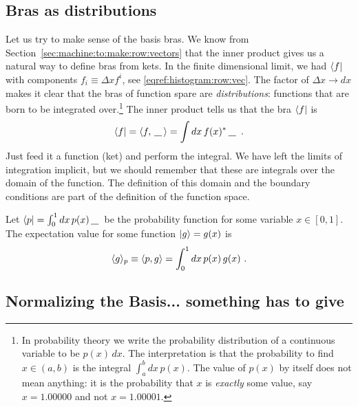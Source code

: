 \subsection{Bras as distributions}

Let us try to make sense of the basis bras. We know from Section~\ref{sec:machine:to:make:row:vectors} that the inner product gives us a natural way to define bras from kets. In the finite dimensional limit, we had  $\left\langle f\right|$ with components $f_i\equiv \Delta x f^i$, see \eqref{eqref:histogram:row:vec}. The factor of $\Delta x \to dx$ makes it clear that the bras of function spare are \emph{distributions}: functions that are born to be integrated over.\footnote{In probability theory we write the probability distribution of a continuous variable to be $p(x)\,dx$. The interpretation is that the probability to find $x\in (a,b)$ is the integral $\int_a^b dx\, p(x)$. The value of $p(x)$ by itself does not mean anything: it is the probability that $x$ is \emph{exactly} some value, say $x=1.00000$ and not $x=1.00001$.} The inner product tells us that the bra $\left\langle f\right|$ is
\begin{align}
    \bra{f} = \la f, \smallslot \ra   = \int dx\, f(x)^* \smallslot \ .
\end{align}
Just feed it a function (ket) and perform the integral. We have left the limits of integration implicit, but we should remember that these are integrals over the domain of the function. The definition of this domain and the boundary conditions are part of the definition of the function space. 
\begin{example}
Let $ \bra{p}=\int_0^1 dx\, p(x)\smallslot$ be the probability function for some variable $x \in [0,1]$. The expectation value for some function $\left|g\right\rangle=g(x)$ is
\begin{align}
\langle g\rangle_p \equiv
     \langle p, g \rangle = \int_0^1 dx\, p(x)\,g(x) \ .
\end{align}
\end{example}

\subsection{Normalizing the Basis... something has to give}

